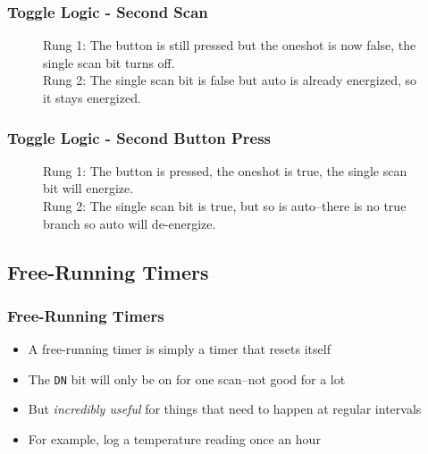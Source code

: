 \begin{frame}
    \frametitle{Toggle Logic - Second Scan}

    \begin{figure}
        \centering
        \resizebox{\linewidth}{!}{
            
        }

        \vspace{0.5em}
        {\footnotesize Rung 1: The button is still pressed but the oneshot is now false, the single scan bit turns off.\\ Rung 2: The single scan bit is false but auto is already energized, so it stays energized. \par}
    \end{figure}
\end{frame}

\begin{frame}
    \frametitle{Toggle Logic - Second Button Press}

    \begin{figure}
        \centering
        \resizebox{\linewidth}{!}{
            
        }

        \vspace{0.5em}
        {\footnotesize Rung 1: The button is pressed, the oneshot is true, the single scan bit will energize.\\ Rung 2: The single scan bit is true, but so is auto--there is no true branch so auto will de-energize. \par}
    \end{figure}
\end{frame}

\subsection{Free-Running Timers}

\begin{frame}
    \frametitle{Free-Running Timers}

    \begin{itemize}
        \item A free-running timer is simply a timer that resets itself
        \item The \texttt{DN} bit will only be on for one scan--not good for a lot
        \item But \emph{incredibly useful} for things that need to happen at regular intervals
        \item For example, log a temperature reading once an hour
    \end{itemize}
\end{frame}

